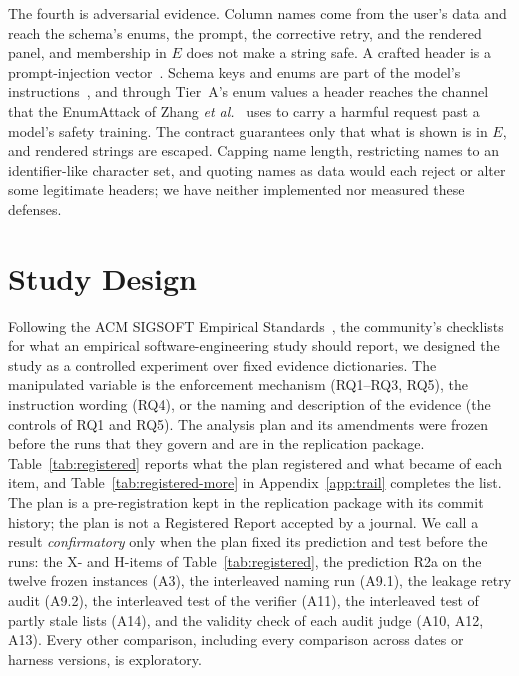 \documentclass[journal]{IEEEtran}
\begin{document}
The fourth is adversarial evidence. Column names come from the user's data and
reach the schema's enums, the prompt, the corrective retry, and the rendered
panel, and membership in $E$ does not make a string safe. A crafted header is
a prompt-injection vector~\cite{greshake2023injection}. Schema keys and enums
are part of the model's instructions~\cite{le2026schemakey}, and through
Tier~A's enum values a header reaches the channel that the EnumAttack of Zhang
\emph{et al.}~\cite{zhang2025cda} uses to carry a harmful request past a
model's safety training. The contract guarantees only that what is shown is in
$E$, and rendered strings are escaped. Capping name length, restricting names
to an identifier-like character set, and quoting names as data would each
reject or alter some legitimate headers; we have neither implemented nor
measured these defenses.

\section{Study Design}\label{sec:design}

Following the ACM SIGSOFT Empirical Standards~\cite{ralph2020standards}, the
community's checklists for what an empirical software-engineering study should
report, we designed the study as a controlled experiment over fixed evidence
dictionaries. The manipulated variable is the enforcement mechanism (RQ1--RQ3,
RQ5), the instruction wording (RQ4), or the naming and description of the
evidence (the controls of RQ1 and RQ5). The analysis plan and its amendments
were frozen before the runs that they govern and are in the replication
package. Table~\ref{tab:registered} reports what the plan registered and what
became of each item, and Table~\ref{tab:registered-more} in
Appendix~\ref{app:trail} completes the list. The plan is a pre-registration kept in the replication
package with its commit history; the plan is not a Registered Report accepted
by a journal. We call a result \emph{confirmatory} only when the plan fixed its
prediction and test before the runs: the X- and H-items of
Table~\ref{tab:registered}, the prediction
R2a on the twelve frozen instances (A3), the interleaved naming run (A9.1), the
leakage retry audit (A9.2), the interleaved test of the verifier (A11), the interleaved
test of partly stale lists (A14), and the validity check of each audit judge
(A10, A12, A13). Every other comparison,
including every comparison across dates or harness versions, is exploratory.
\end{document}
